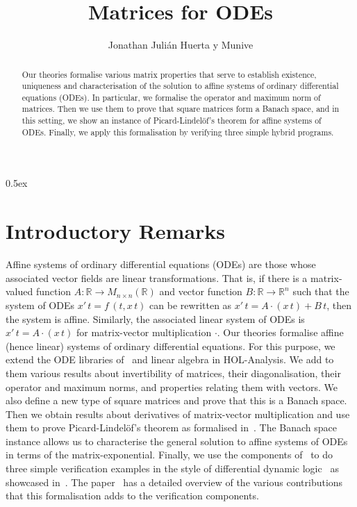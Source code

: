 \documentclass[11pt,a4paper]{article}
\begin{document}
\title{Matrices for ODEs}
\author{Jonathan Juli\'an Huerta y Munive}
\maketitle

\begin{abstract}
  Our theories formalise various matrix properties that serve to establish 
  existence, uniqueness and characterisation of the solution to affine 
  systems of ordinary differential equations (ODEs). In particular, we
  formalise the operator and maximum norm of matrices. Then we use 
  them to prove that square matrices form a Banach space, and in this 
  setting, we show an instance of Picard-Lindel\"of's theorem for affine
  systems of ODEs. Finally, we apply this formalisation by verifying three 
  simple hybrid programs.
\end{abstract}

\tableofcontents

\parindent 0pt\parskip 0.5ex

\section{Introductory Remarks}

Affine systems of ordinary differential equations (ODEs) are those whose associated vector fields are linear transformations. That is, if there is a matrix-valued function $A:\mathbb{R}\to M_{n\times n}(\mathbb{R})$ and vector function $B:\mathbb{R}\to\mathbb{R}^n$ such that the system of ODEs $x'\, t=f\, (t,x\, t)$ can be rewritten as $x'\, t=A\cdot (x\, t)+B\, t$, then the system is affine. Similarly, the associated linear system of ODEs is $x'\, t=A\cdot (x\, t)$ for matrix-vector multiplication $\cdot$. Our theories formalise affine (hence linear) systems of ordinary differential equations. For this purpose, we extend the ODE libraries of~\cite{ImmlerH12a} and linear algebra in HOL-Analysis. We add to them various results about invertibility of matrices, their diagonalisation, their operator and maximum norms, and properties relating them with vectors. We also define a new type of square matrices and prove that this is a Banach space. Then we obtain results about derivatives of matrix-vector multiplication and use them to prove Picard-Lindel\"of's theorem as formalised in~\cite{afp:hybrid}. The Banach space instance allows us to characterise the general solution to affine systems of ODEs in terms of the matrix-exponential. Finally, we use the components of~\cite{afp:hybrid} to do three simple verification examples in the style of differential dynamic logic~\cite{Platzer10} as showcased in~\cite{ArmstrongGS16,FosterMS19,MuniveS19}. The paper~\cite{Munive20} has a detailed overview of the various contributions that this formalisation adds to the verification components.





\end{document}
